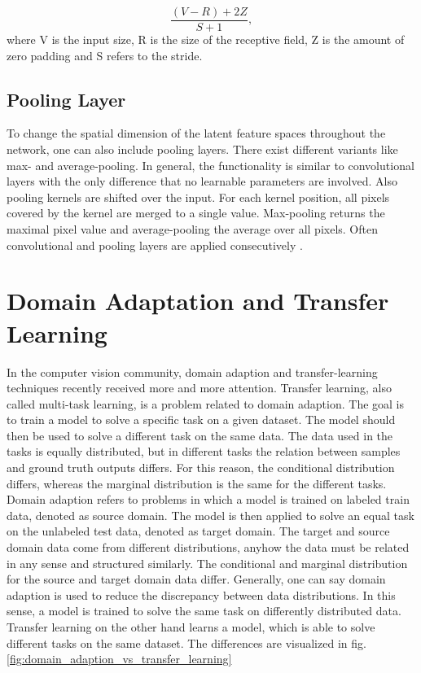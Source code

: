 \begin{equation}
  \frac{(V-R)+2Z}{S+1}, 
  \label{eq:spatial_dimensionality_cnn_feature map}
\end{equation}
where V is the input size, R is the size of the receptive field, Z is the amount of zero padding and S refers to the stride.

\subsection{Pooling Layer}
To change the spatial dimension of the latent feature spaces throughout the network, one can also include pooling layers. There exist different variants like max- and average-pooling. In general, the functionality is similar to convolutional layers with the only difference that no learnable parameters are involved. Also pooling kernels are shifted over the input. For each kernel position, all pixels covered by the kernel are merged to a single value. Max-pooling returns the maximal pixel value and average-pooling the average over all pixels. Often convolutional and pooling layers are applied consecutively \cite{OShea2015}.


\section{Domain Adaptation and Transfer Learning}

In the computer vision community, domain adaption and transfer-learning techniques recently received more and more attention. Transfer learning, also called multi-task learning, is a problem related to domain adaption. The goal is to train a model to solve a specific task on a given dataset. The model should then be used to solve a different task on the same data. The data used in the tasks is equally distributed, but in different tasks the relation between samples and ground truth outputs differs. For this reason, the conditional distribution differs, whereas the marginal distribution is the same for the different tasks. Domain adaption refers to problems in which a model is trained on labeled train data, denoted as source domain. The model is then applied to solve an equal task on the unlabeled test data, denoted as target domain. The target and source domain data come from different distributions, anyhow the data must be related in any sense and structured similarly. The conditional and marginal distribution for the source and target domain data differ. Generally, one can say domain adaption is used to reduce the discrepancy between data distributions. In this sense, a model is trained to solve the same task on differently distributed data. Transfer learning on the other hand learns a model, which is able to solve different tasks on the same dataset. The differences are visualized in fig. \ref{fig:domain_adaption_vs_transfer_learning}

